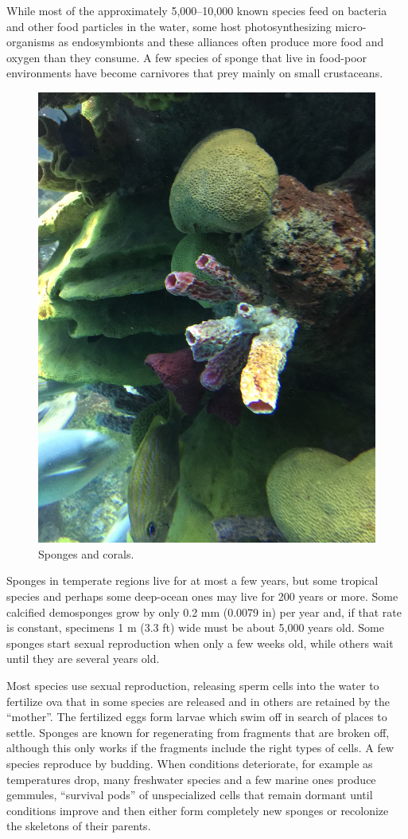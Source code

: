 While most of the approximately 5,000--10,000 known species feed on
bacteria and other food particles in the water, some host
photosynthesizing micro-organisms as endosymbionts and these alliances
often produce more food and oxygen than they consume. A few species of
sponge that live in food-poor environments have become carnivores that
prey mainly on small crustaceans.

\begin{figure}

{\centering \includegraphics[width=0.7\linewidth]{./figures/porifera/sponges}

}

\caption{Sponges and corals.}\label{fig:sponges}
\end{figure}

Sponges in temperate regions live for at most a few years, but some
tropical species and perhaps some deep-ocean ones may live for 200 years
or more. Some calcified demosponges grow by only 0.2 mm (0.0079 in) per
year and, if that rate is constant, specimens 1 m (3.3 ft) wide must be
about 5,000 years old. Some sponges start sexual reproduction when only
a few weeks old, while others wait until they are several years old.

Most species use sexual reproduction, releasing sperm cells into the
water to fertilize ova that in some species are released and in others
are retained by the ``mother''. The fertilized eggs form larvae which
swim off in search of places to settle. Sponges are known for
regenerating from fragments that are broken off, although this only
works if the fragments include the right types of cells. A few species
reproduce by budding. When conditions deteriorate, for example as
temperatures drop, many freshwater species and a few marine ones produce
gemmules, ``survival pods'' of unspecialized cells that remain dormant
until conditions improve and then either form completely new sponges or
recolonize the skeletons of their parents.

